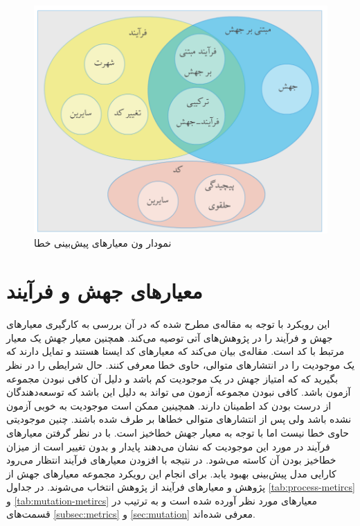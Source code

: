 \begin{figure}[H]
	\centering
	\includegraphics[width=.7\textwidth]{img/method/venn.png}
	\caption{نمودار ون معیارهای پیش‌بینی خطا }
	\label{fig:venn}
\end{figure}


\section{معیارهای جهش و فرآیند}
\label{sec:method-phase1}

این رویکرد با توجه به مقاله‌ی \cite{bowes2016mutation} مطرح شده که در آن بررسی به کارگیری معیارهای جهش و فرآیند را در پژوهش‌های آتی توصیه می‌کند.  همچنین  معیار جهش یک معیار  مرتبط با کد است. مقاله‌ی \cite{rahman2013and}  بیان می‌کند که معیارهای کد ایستا هستند و تمایل دارند که یک موجودیت را در انتشارهای متوالی، حاوی خطا معرفی کنند. حال شرایطی را در نظر بگیرید که که امتیاز جهش در یک موجودیت کم باشد و دلیل آن کافی نبودن مجموعه آزمون باشد. کافی نبودن مجموعه آزمون می تواند به دلیل این باشد که توسعه‌دهندگان از درست بودن کد اطمینان دارند. همچینین ممکن است  موجودیت به خوبی آزمون نشده باشد ولی پس از انتشارهای متوالی خطاها بر طرف شده باشند. چنین موجودیتی حاوی خطا نیست اما با توجه به معیار جهش خطا‌خیز است. با در نظر گرفتن معیارهای فرآیند در مورد این موجودیت که نشان می‌دهند پایدار و بدون تغییر است از میزان خطا‌خیز بودن آن کاسته می‌شود. در نتیجه با افزودن معیارهای فرآیند انتظار می‌رود کارایی مدل پیش‌بینی بهبود یابد. 
برای  انجام این رویکرد مجموعه معیارهای جهش  از پژوهش \cite{bowes2016mutation}  و معیارهای فرآیند از پژوهش \cite{rahman2013and} انتخاب می‌شوند. در جداول  \ref{tab:process-metircs} و \ref{tab:mutation-metircs} معیارهای مورد نظر آورده شده است و به ترتیب در قسمت‌های \ref{subsec:metrics} و \ref{sec:mutation} معرفی شده‌اند.\\




